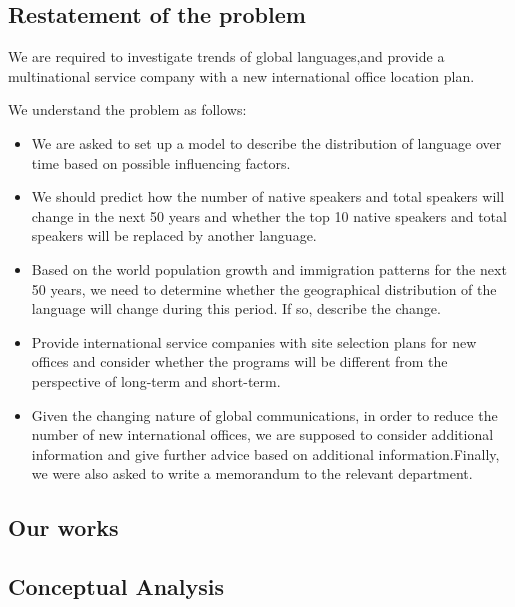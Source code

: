 \subsection{Restatement of the problem}
\noindent
We are required to investigate trends of global languages,and provide a multinational service company with a new international office location plan.\\
\par We understand the problem as follows:

	\begin{itemize}
		\item
We are asked to set up a model to describe the distribution of language over time based on possible influencing factors.
		\item
We should predict how the number of native speakers and total speakers will change in the next 50 years and whether the top 10 native speakers and total speakers will be replaced by another language.
		 \item
Based on the world population growth and immigration patterns for the next 50 years, we need to determine whether the geographical distribution of the language will change during this period. If so, describe the change.
		 \item 
Provide international service companies with site selection plans for new offices and consider whether the programs will be different from the perspective of long-term and short-term.
		\item 
Given the changing nature of global communications, in order to reduce the number of new international offices, we are supposed to consider additional information and give further advice based on additional information.Finally, we were also asked to write a memorandum to the relevant department. 		 	 
	\end{itemize}



\subsection{Our works}

\subsection{Conceptual Analysis}

